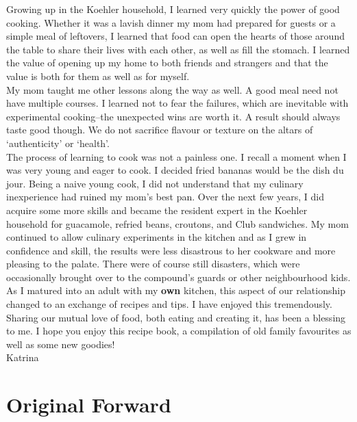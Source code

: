 \documentclass[12pt]{memoir} %
\begin{document}
Growing up in the Koehler household, I learned very quickly the power of good cooking. Whether it was a lavish dinner my mom had prepared for guests or a simple meal of leftovers, I learned that food can open the hearts of those around the table to share their lives with each other, as well as fill the stomach. I learned the value of opening up my home to both friends and strangers and that the value is both for them as well as for myself. \\[10pt]
My mom taught me other lessons along the way as well. A good meal need not have multiple courses. I learned not to fear the failures, which are inevitable with experimental cooking--the unexpected wins are worth it. A result should always taste good though. We do not sacrifice flavour or texture on the altars of `authenticity' or `health'. \\[10pt]
The process of learning to cook was not a painless one. I recall a moment when I was very young and eager to cook. I decided fried bananas would be the dish du jour. Being a naive young cook, I did not understand that my culinary inexperience had ruined my mom's best pan. Over the next few years, I did acquire some more skills and became the resident expert in the Koehler household for guacamole, refried beans, croutons, and Club sandwiches. My mom continued to allow culinary experiments in the kitchen and as I grew in confidence and skill, the results were less disastrous to her cookware and more pleasing to the palate. There were of course still disasters, which were occasionally brought over to the compound's guards or other neighbourhood kids. \\[10pt]
As I matured into an adult with my \textbf{own} kitchen, this aspect of our relationship changed to an exchange of recipes and tips. I have enjoyed this tremendously. Sharing our mutual love of food, both eating and creating it, has been a blessing to me. I hope you enjoy this recipe book, a compilation of old family favourites as well as some new goodies! \\[10pt]
\hspace{0.5\linewidth}Katrina

\chapter*{Original Forward} %
\end{document}
